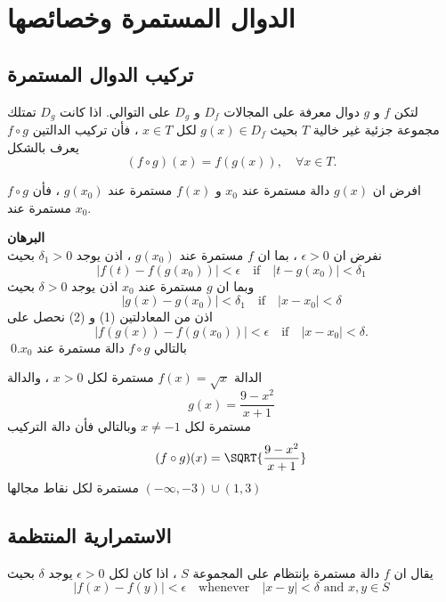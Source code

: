 \chapter{الدوال المستمرة وخصائصها}

\section{تركيب الدوال المستمرة}

\begin{definition}
	لتكن $f$ و $g$ دوال معرفة على المجالات $D_f$ و $D_g$ على التوالي. اذا كانت $D_g$ تمتلك مجموعة جزئية غير خالية $T$ بحيث $g(x) \in D_f$ لكل $x\in T$ ، فأن تركيب الدالتين $f\circ g$ يعرف بالشكل
	\[
	(f \circ g)(x) = f(g(x)), \quad \forall x\in T.
	\]
\end{definition}

\begin{theorem}
	افرض ان $g(x)$ دالة مستمرة عند $x_0 $ و $f(x)$ مستمرة عند $g(x_0)$  ، فأن $f\circ g$ مستمرة عند $x_0$.
\end{theorem}
\noindent
\textbf{البرهان}\\
\noindent
نفرض ان $\epsilon > 0 $ ، بما ان $f$ مستمرة عند $g(x_0)$ ، اذن يوجد $\delta_1> 0 $ بحيث
\begin{equation}
	| f(t)  - f(g(x_0))| < \epsilon \quad\text{if}\quad |t - g(x_0)| < \delta_1
\end{equation}
وبما ان $g$ مستمرة عند $x_0 $ اذن يوجد $\delta > 0 $ بحيث
\begin{equation}
	|g(x) - g(x_0) | < \delta_1 \quad\text{if}\quad |x-x_0| < \delta
\end{equation}
اذن من المعادلتين (1) و (2) نحصل على 
\[
|f(g(x)) - f(g(x_0)) | < \epsilon \quad\text{if}\quad |x-x_0| < \delta.
\] 
بالتالي $f\circ g$ دالة مستمرة عند $x_0$.\qed

\begin{example}
	الدالة $f(x) = \sqrt{x}$ مستمرة لكل $x> 0 $ ، والدالة
	\[
	g(x) = \frac{9 - x^2}{x + 1} 
	\]
	مستمرة لكل $x \neq -1 $ وبالتالي فأن دالة التركيب 
	\[
	(f\circ g)(x) = \SQRT{\frac{9-x^2}{x+1}}
	\]
	مستمرة لكل نقاط مجالها  
	$(-\infty, -3) \cup (1,3)$
\end{example}

\section{الاستمرارية المنتظمة \cite{introrealanal}}

\begin{definition}
	يقال ان $f$ دالة مستمرة بإنتظام على المجموعة $S$ ، اذا كان لكل  $\epsilon > 0 $ يوجد $\delta$ بحيث
	\[
	|f(x) - f(y) | < \epsilon \quad\text{whenever}\quad |x-y| < \delta \,\, \text{and}\,\, x,y\in S
	\] 
\end{definition}

